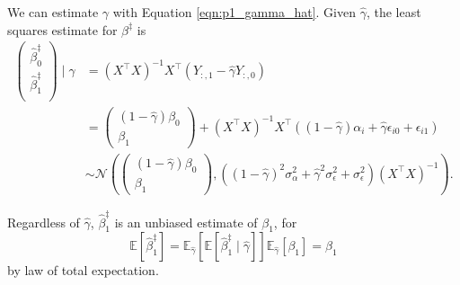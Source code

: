 \documentclass[letterpaper,11pt]{article}
\begin{document}
\begin{enumerate}
\begin{enumerate}
\begin{description}
\begin{description}
        We can estimate $\gamma$ with Equation \ref{eqn:p1_gamma_hat}. Given
        $\hat{\gamma}$, the least squares estimate for $\beta^\ddagger$ is
        \begin{align}
          \begin{pmatrix}
            \hat{\beta}_0^\ddagger \\
            \hat{\beta}_1^\ddagger \\
          \end{pmatrix}
          \mid \hat{\gamma}
          &= \left(X^\intercal X\right)^{-1}X^\intercal\left(
            Y_{:,1} - \hat{\gamma}Y_{:,0}
            \right) \label{eqn:p1_ancova_estimator_dist}\\
          &= \begin{pmatrix}
            \left(1 - \hat{\gamma}\right)\beta_0 \\
            \beta_1
          \end{pmatrix} +
          \left(X^\intercal X\right)^{-1}X^\intercal
          \left(
          \left(1 -\hat{\gamma}\right)\alpha_i +
          \hat{\gamma}\epsilon_{i0} +
          \epsilon_{i1}
          \right)
          \nonumber\\
          &\sim \mathcal{N}\left(
            \begin{pmatrix}
              \left(1 - \hat{\gamma}\right)\beta_0 \\
              \beta_1
            \end{pmatrix},
          \left(
          \left(1 - \hat{\gamma}\right)^2\sigma_\alpha^2
          + \hat{\gamma}^2\sigma_\epsilon^2 + \sigma_\epsilon^2
          \right)
          \left(X^\intercal X\right)^{-1}
            \right).\nonumber
        \end{align}
        
        Regardless of $\hat{\gamma}$, $\hat{\beta}^\ddagger_1$ is an unbiased
        estimate of $\beta_1$, for
        \[
          \mathbb{E}\left[\hat{\beta}_1^\ddagger\right] =
          \mathbb{E}_{\hat{\gamma}}\left[
            \mathbb{E}\left[\hat{\beta}_1^\ddagger \mid \hat{\gamma}\right]
          \right]
          \mathbb{E}_{\hat{\gamma}}\left[\beta_1\right] = \beta_1
        \]
      by law of total expectation.
      \end{description}


\end{description}
\end{enumerate}
\end{enumerate}
\end{document}
